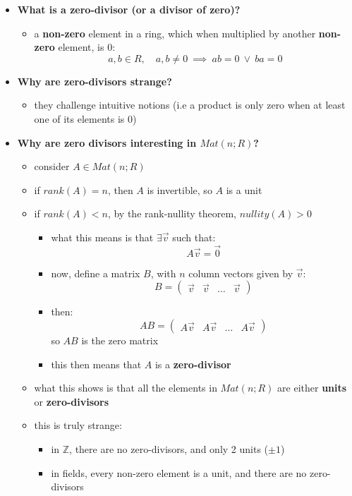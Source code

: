 \documentclass{exam}
\begin{document}
\begin{itemize}
    \item \textbf{What is a zero-divisor (or a divisor of zero)?}
    \begin{itemize}
        \item a \textbf{non-zero} element in a ring, which when multiplied by another \textbf{non-zero} element, is 0:
        \[
        a,b \in R, \quad a,b \neq 0 \ \implies \ ab = 0 \ \vee \ ba = 0
        \]
    \end{itemize}
    \item \textbf{Why are zero-divisors strange?}
    \begin{itemize}
        \item they challenge intuitive notions (i.e a product is only zero when at least one of its elements is 0)
    \end{itemize}
    \item \textbf{Why are zero divisors interesting in $Mat(n;R)$?}
    \begin{itemize}
        \item consider $A \in Mat(n;R)$
        \item if $rank(A) = n$, then $A$ is invertible, so $A$ is a unit
        \item if $rank(A) < n$, by the rank-nullity theorem, $nullity(A) > 0$
        \begin{itemize}
            \item what this means is that $\exists \vec{v}$ such that:
            \[
            A\vec{v} = \vec{0}
            \]
            \item now, define a matrix $B$, with $n$ column vectors given by $\vec{v}$:
            \[
            B = \begin{pmatrix}
            \vec{v} & \vec{v} & \ldots & \vec{v}
            \end{pmatrix}
            \]
            \item then:
            \[
            AB = \begin{pmatrix}
            A\vec{v} & A\vec{v} & \ldots & A\vec{v}
            \end{pmatrix}
            \]
            so $AB$ is the zero matrix
            \item this then means that $A$ is a \textbf{zero-divisor}
        \end{itemize}
        \item what this shows is that all the elements in $Mat(n;R)$ are either \textbf{units} or \textbf{zero-divisors}
        \item this is truly strange: 
        \begin{itemize}
            \item in $\mathbb{Z}$, there are no zero-divisors, and only 2 units ($\pm 1$)
            \item in fields, every non-zero element is a unit, and there are no zero-divisors
        \end{itemize}
    \end{itemize}
\end{itemize}
\end{document}
